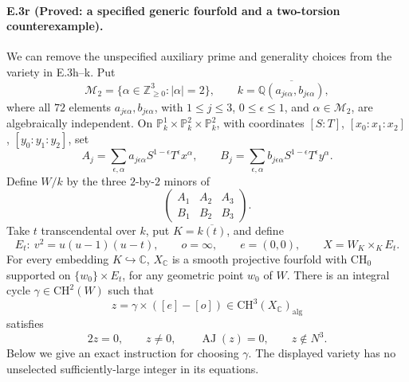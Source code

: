 \paragraph{E.3r (Proved: a specified generic fourfold and a two-torsion
counterexample).}
We can remove the unspecified auxiliary prime and generality choices
from the variety in E.3h--k. Put
\[
 \mathcal M_2=\{\alpha\in\mathbb Z_{\ge0}^3:|\alpha|=2\},
 \qquad
 k=\overline{\mathbb Q(a_{j\epsilon\alpha},b_{j\epsilon\alpha})},
\]
where all $72$ elements $a_{j\epsilon\alpha},b_{j\epsilon\alpha}$,
with $1\le j\le3$, $0\le\epsilon\le1$, and
$\alpha\in\mathcal M_2$, are algebraically independent.
On $\mathbb P^1_k\times\mathbb P^2_k\times\mathbb P^2_k$,
with coordinates $[S:T]$, $[x_0:x_1:x_2]$, $[y_0:y_1:y_2]$, set
\[
 A_j=\sum_{\epsilon,\alpha}
      a_{j\epsilon\alpha}S^{1-\epsilon}T^\epsilon x^\alpha,
 \qquad
 B_j=\sum_{\epsilon,\alpha}
      b_{j\epsilon\alpha}S^{1-\epsilon}T^\epsilon y^\alpha.
\]
Define $W/k$ by the three $2$-by-$2$ minors of
\[
                  \begin{pmatrix}A_1&A_2&A_3\\B_1&B_2&B_3\end{pmatrix}.
\]
Take $t$ transcendental over $k$, put $K=\overline{k(t)}$, and define
\[
 E_t:\ v^2=u(u-1)(u-t),\qquad o=\infty,\qquad e=(0,0),
 \qquad X=W_K\times_K E_t.
\]
For every embedding $K\hookrightarrow\mathbb C$, $X_{\mathbb C}$
is a smooth projective fourfold with $\mathrm{CH}_0$ supported on
$\{w_0\}\times E_t$, for any geometric point $w_0$ of $W$.
There is an integral cycle $\gamma\in\mathrm{CH}^2(W)$ such that
\[
 z=\gamma\times([e]-[o])
       \in\mathrm{CH}^3(X_{\mathbb C})_{\mathrm{alg}}
\]
satisfies
\begin{equation}\label{eq:explicit-os-torsion}
             2z=0,\qquad z\ne0,\qquad
             \operatorname{AJ}(z)=0,\qquad z\notin N^3.
\end{equation}
Below we give an exact instruction for choosing $\gamma$.
The displayed variety has no unselected sufficiently-large integer
in its equations.

